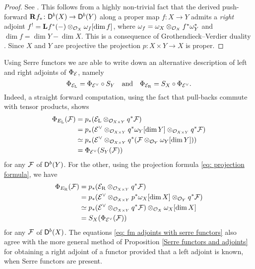 \begin{proof}
    See \cite[\S 5, Proposition 5.9]{huybrechts2006fouriermukai}. This follows from a highly non-trivial fact that the derived push-forward $\mathbf{R}^{}f_* \colon \mathsf{D}^b(X) \to \mathsf{D}^b(Y)$ along a proper map $f \colon X \to Y$ admits a \emph{right} adjoint $f^! = \mathbf{L}^{}f^*(-) \otimes_{\mathcal{O}_{X}} \omega_f[\dim f]$, where $\omega_f = \omega_X \otimes_{\mathcal{O}_{X}} f^*\omega_Y^*$ and $\dim f = \dim Y - \dim X$. This is a consequence of Grothendieck--Verdier duality \cite[\S VII, Corollary 4.3]{Hartshorne1966}. Since $X$ and $Y$ are projective the projection $p \colon X \times Y \to X$ is proper.
\end{proof}

\begin{remark}
    \label{another description of adjoints of FM}
    Using Serre functors we are able to write down an alternative description of left and right adjoints of $\Phi_{\mathcal E}$, namely
    \begin{equation}
        \label{eq: fm adjoints with serre functors}
        \Phi_{\mathcal E_\mathrm{L}} = \Phi_{\mathcal E^\vee} \circ S_Y \quad \text{and} \quad 
        \Phi_{\mathcal E_\mathrm{R}} = S_X \circ \Phi_{\mathcal E^\vee}.
    \end{equation}
    Indeed, a straight forward computation, using the fact that pull-backs commute with tensor products, shows
    \begin{align*}
        \Phi_{E_\mathrm{L}}(\mathcal F) &= p_*(\mathcal E_\mathrm{L} \otimes_{{\mathcal{O}_{X \times Y}}} q^*\mathcal F) \\
        &= p_*(\mathcal E^\vee \otimes_{{\mathcal{O}_{X \times Y}}} q^*\omega_Y[\dim Y] \otimes_{{\mathcal{O}_{X \times Y}}} q^*\mathcal F) \\
        &\simeq p_*(\mathcal E^\vee \otimes_{{\mathcal{O}_{X \times Y}}} q^*(\mathcal F \otimes_{{\mathcal{O}_{Y}}} \omega_Y[\dim Y])) \\
        &= \Phi_{\mathcal E^\vee}(S_Y(\mathcal F))
    \end{align*}
    for any $\mathcal F$ of $\mathsf{D}^b(Y)$. For the other, using the projection formula \eqref{eq: projection formula}, we have
    \begin{align*}
        \Phi_{E_\mathrm{R}}(\mathcal F) &= p_*(\mathcal E_\mathrm{R} \otimes_{{\mathcal{O}_{X \times Y}}} q^*\mathcal F) \\
        &= p_*(\mathcal E^\vee \otimes_{{\mathcal{O}_{X \times Y}}} p^*\omega_X[\dim X] \otimes_{{\mathcal{O}_{Y}}} q^*\mathcal F) \\
        & \simeq p_*(\mathcal E^\vee \otimes_{{\mathcal{O}_{X \times Y}}} q^*\mathcal F) \otimes_{\mathcal{O}_{X}} \omega_X[\dim X] \\
        &= S_X(\Phi_{\mathcal E^\vee}(\mathcal F))
    \end{align*}
    for any $\mathcal F$ of $\mathsf{D}^b(X)$. The equations \eqref{eq: fm adjoints with serre functors} also agree with the more general method of Proposition \ref{Serre functors and adjoints} for obtaining a right adjoint of a functor provided that a left adjoint is known, when Serre functors are present.
\end{remark}


